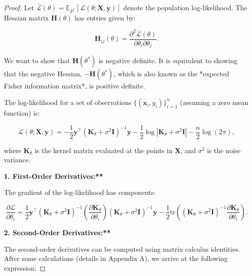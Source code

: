 \begin{proof}
Let $\bar{\mathcal{L}}(\theta) = \mathbb{E}_{P^*}[\mathcal{L}(\theta; \mathbf{X}, \mathbf{y})]$ denote the population log-likelihood. The Hessian matrix $\mathbf{H}(\theta)$ has entries given by:

$$
\mathbf{H}_{ij}(\theta) = \frac{\partial^2 \bar{\mathcal{L}}(\theta)}{\partial \theta_i \partial \theta_j}.
$$

We want to show that $\mathbf{H}(\theta^*)$ is negative definite. It is equivalent to showing that the negative Hessian, $-\mathbf{H}(\theta^*)$, which is also known as the *expected Fisher information matrix*, is positive definite.

The log-likelihood for a set of observations $\{(\mathbf{x}_i, y_i)\}_{i=1}^n$ (assuming a zero mean function) is:

$$
\mathcal{L}(\theta; \mathbf{X}, \mathbf{y}) = -\frac{1}{2} \mathbf{y}^\top (\mathbf{K}_\theta + \sigma^2 \mathbf{I})^{-1} \mathbf{y} - \frac{1}{2} \log|\mathbf{K}_\theta + \sigma^2 \mathbf{I}| - \frac{n}{2} \log(2\pi),
$$

where $\mathbf{K}_\theta$ is the kernel matrix evaluated at the points in $\mathbf{X}$, and $\sigma^2$ is the noise variance.

\textbf{1. First-Order Derivatives:**}

The gradient of the log-likelihood has components:

$$
\frac{\partial \mathcal{L}}{\partial \theta_i} = \frac{1}{2} \mathbf{y}^\top (\mathbf{K}_\theta + \sigma^2 \mathbf{I})^{-1} \left(\frac{\partial \mathbf{K}_\theta}{\partial \theta_i}\right) (\mathbf{K}_\theta + \sigma^2 \mathbf{I})^{-1} \mathbf{y} - \frac{1}{2} \text{tr}\left((\mathbf{K}_\theta + \sigma^2 \mathbf{I})^{-1} \frac{\partial \mathbf{K}_\theta}{\partial \theta_i}\right).
$$

\textbf{2. Second-Order Derivatives:**}

The second-order derivatives can be computed using matrix calculus identities. After some calculations (details in Appendix A), we arrive at the following expression:


\end{proof}
